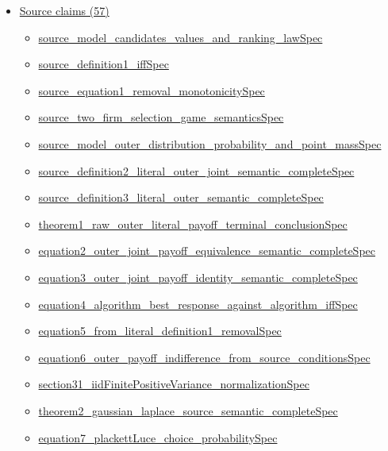 \documentclass[10pt]{article}
\begin{document}
\begin{itemize}[leftmargin=1.2em]
\begin{itemize}[leftmargin=1.2em]
\item \hyperlink{library-prerequisite-f185c8e6394c9317}{EconCSLib.pmfProd}
\end{itemize}
\item \hyperlink{source-section-f10b5f68e4acf3dc}{Source claims (57)}
\begin{itemize}[leftmargin=1.2em]
\item \hyperlink{source-claim-70a4d7b84f526fcd}{source\_model\_candidates\_values\_and\_ranking\_lawSpec}
\item \hyperlink{source-claim-fbe3ef1f5678507e}{source\_definition1\_iffSpec}
\item \hyperlink{source-claim-413fc0a7e71398bc}{source\_equation1\_removal\_monotonicitySpec}
\item \hyperlink{source-claim-f4aa43d846eb3ae7}{source\_two\_firm\_selection\_game\_semanticsSpec}
\item \hyperlink{source-claim-fcc1dae9c26a2b31}{source\_model\_outer\_distribution\_probability\_and\_point\_massSpec}
\item \hyperlink{source-claim-a71947e08e3fd64a}{source\_definition2\_literal\_outer\_joint\_semantic\_completeSpec}
\item \hyperlink{source-claim-faa08c37fc761736}{source\_definition3\_literal\_outer\_semantic\_completeSpec}
\item \hyperlink{source-claim-f88d6727dfcb8617}{theorem1\_raw\_outer\_literal\_payoff\_terminal\_conclusionSpec}
\item \hyperlink{source-claim-0a74bbe90425faa9}{equation2\_outer\_joint\_payoff\_equivalence\_semantic\_completeSpec}
\item \hyperlink{source-claim-36b115610854f337}{equation3\_outer\_joint\_payoff\_identity\_semantic\_completeSpec}
\item \hyperlink{source-claim-ea5f4fa858fd5854}{equation4\_algorithm\_best\_response\_against\_algorithm\_iffSpec}
\item \hyperlink{source-claim-9d6309ccb42ce9df}{equation5\_from\_literal\_definition1\_removalSpec}
\item \hyperlink{source-claim-fa14b138c169a341}{equation6\_outer\_payoff\_indifference\_from\_source\_conditionsSpec}
\item \hyperlink{source-claim-bd2d52e2663b165c}{section31\_iidFinitePositiveVariance\_normalizationSpec}
\item \hyperlink{source-claim-cc8111af16950cc8}{theorem2\_gaussian\_laplace\_source\_semantic\_completeSpec}
\item \hyperlink{source-claim-8940f397fa4678ac}{equation7\_plackettLuce\_choice\_probabilitySpec}

\end{itemize}
\end{itemize}
\end{document}
